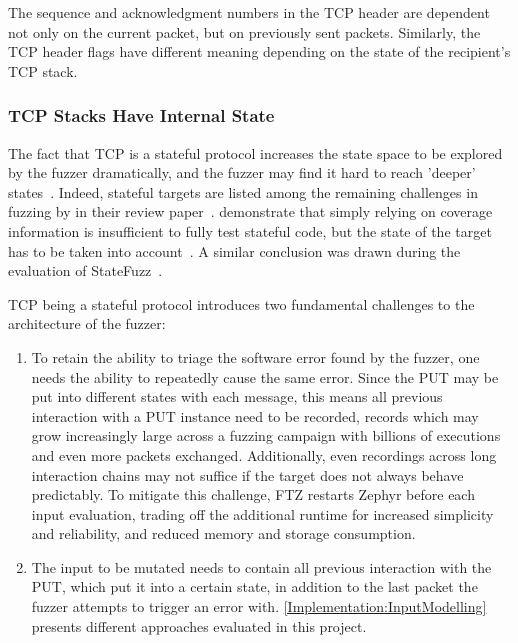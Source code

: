 \documentclass[twocolumn]{article}
\newcommand{\proj}{FTZ\xspace}
\let\savedCite=\cite
\renewcommand{\cite}{\unskip~\savedCite}
\begin{document}
The sequence and acknowledgment numbers in the TCP header are dependent not only on the current packet, but on previously sent packets. Similarly, the TCP header flags have different meaning depending on the state of the recipient's TCP stack.

\subsubsection{TCP Stacks Have Internal State}
\label{Background:TcpIsStateful}

The fact that TCP is a stateful protocol increases the state space to be explored by the fuzzer dramatically, and the fuzzer may find it hard to reach 'deeper' states\cite{StatefulReview}. Indeed, stateful targets are listed among the remaining challenges in fuzzing by \citeauthor{ChallengesAndReflections} in their review paper\cite{ChallengesAndReflections}. \citeauthor{SGFuzz} demonstrate that simply relying on coverage information is insufficient to fully test stateful code, but the state of the target has to be taken into account\cite{SGFuzz}. A similar conclusion was drawn during the evaluation of StateFuzz\cite{StateFuzz}.

TCP being a stateful protocol introduces two fundamental challenges to the architecture of the fuzzer:
\begin{enumerate}
  \item To retain the ability to triage the software error found by the fuzzer, one needs the ability to repeatedly cause the same error. Since the PUT may be put into different states with each message, this means all previous interaction with a PUT instance need to be recorded, records which may grow increasingly large across a fuzzing campaign with billions of executions and even more packets exchanged. Additionally, even recordings across long interaction chains may not suffice if the target does not always behave predictably. To mitigate this challenge, \proj restarts Zephyr before each input evaluation, trading off the additional runtime for increased simplicity and reliability, and reduced memory and storage consumption.
  \item The input to be mutated needs to contain all previous interaction with the PUT, which put it into a certain state, in addition to the last packet the fuzzer attempts to trigger an error with. \cref{Implementation:InputModelling} presents different approaches evaluated in this project.
\end{enumerate}
\end{document}
